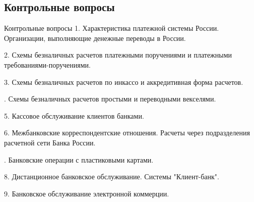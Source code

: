 \documentclass[_Banking_p3.tex]{subfiles}
\begin{document}
\subsection{Контрольные вопросы}
\begin{frame}[ allowframebreaks ]{Контрольные вопросы}
1. Характеристика платежной системы России. Организации, выполняющие денежные переводы в России.

2. Схемы безналичных расчетов платежными поручениями и платежными требованиями-поручениями.

3. Схемы безналичных расчетов по инкассо и аккредитивная форма расчетов.

. Схемы безналичных расчетов простыми и переводными векселями.

5. Кассовое обслуживание клиентов  банками.

6. Межбанковские корреспондентские отношения. Расчеты через подразделения расчетной сети Банка России.

. Банковские операции с пластиковыми картами.

8. Дистанционное банковское обслуживание. Системы "Клиент-банк".

9. Банковское обслуживание электронной коммерции.
\end{frame}
\end{document}
